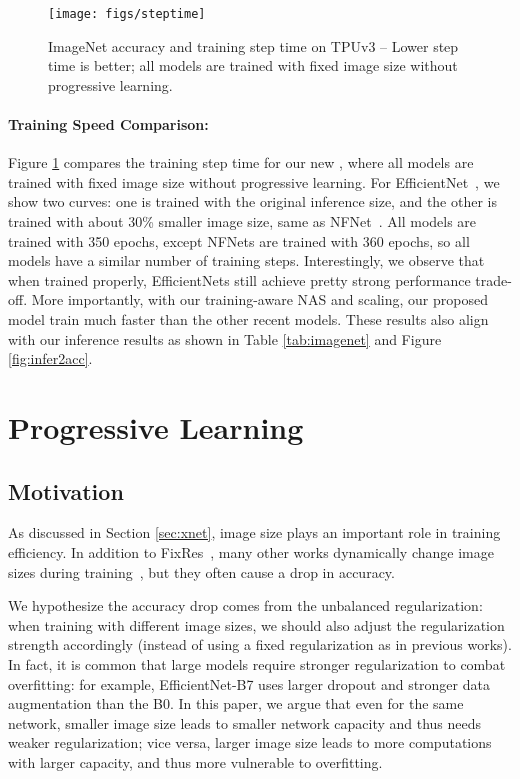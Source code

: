 \documentclass{article}
\begin{document}
\begin{figure}[!ht]
    \vskip -0.1in
    \centering
    \texttt{[image: figs/steptime]}
    \vskip -0.15in
    \caption{ImageNet accuracy and training step time on TPUv3 -- Lower step time is better; all models are trained with fixed image size without progressive learning.}
     \label{fig:steptime}
    \vskip -0.1in
\end{figure}
 
\paragraph{Training Speed Comparison:}
Figure \ref{fig:steptime} compares the training step time for our new {\xnet}, where all models are trained with fixed image size without progressive learning. For EfficientNet~\cite{efficientnet19}, we show two curves: one is trained with the original inference size, and the other is trained with about 30\% smaller image size, same as NFNet~\cite{fixres20,nfnet21}. All models are trained with 350 epochs, except  NFNets are trained with 360 epochs, so all models have a similar number of training steps. Interestingly, we observe that when trained properly, EfficientNets still achieve pretty strong performance trade-off. More importantly, with our training-aware NAS and scaling, our  proposed {\xnet} model train much faster than the other recent models. These results  also align with our inference results as shown in Table \ref{tab:imagenet} and Figure \ref{fig:infer2acc}.



\section{Progressive Learning}
\label{sec:plearn}


\subsection{Motivation}
\label{sec:motivation}

As discussed in Section \ref{sec:xnet}, image size plays an important role in training efficiency. In addition to FixRes~\cite{fixres20}, many other works dynamically change image sizes during training~\cite{fastaidawnbench,mixmatch19}, but they often cause a drop in accuracy.

We hypothesize the accuracy drop comes from the unbalanced regularization: when training with different image sizes, we should also adjust the regularization strength accordingly (instead of using a fixed regularization as in previous works). In fact, it is common that large models require stronger regularization to combat overfitting: for example, EfficientNet-B7 uses larger dropout and stronger data augmentation than the B0. In this paper, we argue that even for the same network, smaller image size leads to smaller network capacity and thus needs weaker regularization; vice versa, larger image size leads to more computations with larger capacity,  and thus more vulnerable to
overfitting.
\end{document}
